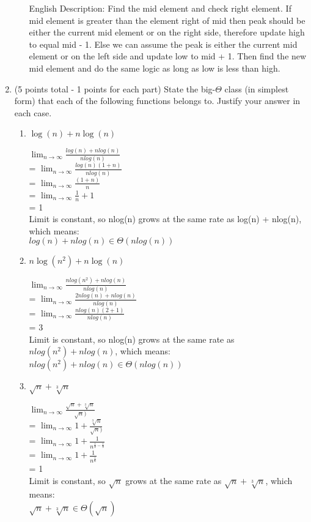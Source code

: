 \documentclass[11pt,letterpaper,unboxed,cm]{hmcpset}
\begin{document}
\begin{enumerate}
\begin{enumerate}[(a)]
\begin{algorithmic}
English Description: Find the mid element and check right element. If mid element is greater than the element right of mid then peak should be either the current mid element or on the right side, therefore update high to equal mid - 1. Else we can assume the peak is either the current mid element or on the left side and update low to mid + 1. Then find the new mid element and do the same logic as long as low is less than high.

\end{algorithmic}
\bigskip

\end{enumerate}


\bigskip
\item (5 points total - 1 points for each part)
State the big-$\Theta$ class (in simplest form) that each of the following functions belongs to.  Justify your answer in each case.
\begin{enumerate}
\item
$\log(n)+n\log(n)$

\bigskip
$\lim_{n\to\infty} \frac{log(n) + nlog(n)}{nlog(n)}$ \\
 = $\lim_{n\to\infty} \frac{log(n)(1 + n)}{nlog(n)}$ \\
 = $\lim_{n\to\infty} \frac{(1 + n)}{n}$ \\
 = $\lim_{n\to\infty} \frac{1}{n} + 1$ \\
 = 1 \\
 Limit is constant, so nlog(n) grows at the same rate as log(n) + nlog(n), which means: \\
 $log(n) + nlog(n) \in \Theta(nlog(n))$
\bigskip

\item
$n\log(n^2)+n\log(n)$

\bigskip
$\lim_{n\to\infty} \frac{nlog(n^2) + nlog(n)}{nlog(n)}$ \\
 = $\lim_{n\to\infty} \frac{2nlog(n) + nlog(n)}{nlog(n)}$ \\
 = $\lim_{n\to\infty} \frac{nlog(n)(2 + 1)}{nlog(n)}$ \\
 = 3 \\
 Limit is constant, so nlog(n) grows at the same rate as $nlog(n^2) + nlog(n)$, which means: \\
 $nlog(n^2) + nlog(n) \in \Theta(nlog(n))$
\bigskip

\item
$\sqrt{n}+\sqrt[3]{n}$

\bigskip
$\lim_{n\to\infty} \frac{\sqrt{n} + \sqrt[3]{n}}{\sqrt{n})}$ \\
 = $\lim_{n\to\infty} 1 + \frac{\sqrt[3]{n}}{\sqrt{n})}$ \\
 = $\lim_{n\to\infty} 1 + \frac{1}{n^{\frac{1}{2} - \frac{1}{3}}}$ \\
 = $\lim_{n\to\infty} 1 + \frac{1}{n^{\frac{1}{6}}}$ \\
 = 1 \\
 Limit is constant, so $\sqrt{n}$ grows at the same rate as $\sqrt{n} + \sqrt[3]{n}$, which means: \\
 $\sqrt{n} + \sqrt[3]{n} \in \Theta(\sqrt{n})$
\bigskip


\end{enumerate}
\end{enumerate}
\end{document}

